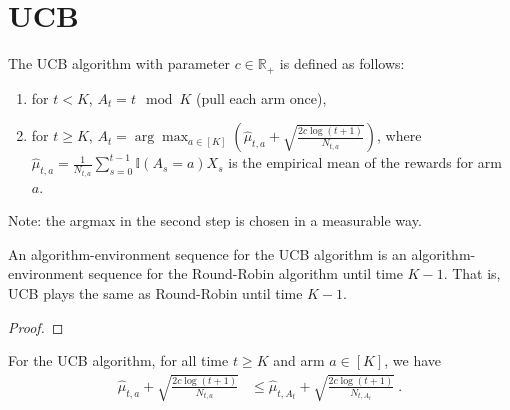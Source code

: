 \section{UCB}

\begin{definition}\label{def:ucbAlgorithm}
  \leanok
The UCB algorithm with parameter $c \in \mathbb{R}_+$ is defined as follows:
\begin{enumerate}
  \item for $t < K$, $A_t = t \mod K$ (pull each arm once),
  \item for $t \ge K$, $A_t = \arg\max_{a \in [K]} \left( \hat{\mu}_{t,a} + \sqrt{\frac{2 c \log(t + 1)}{N_{t,a}}} \right)$, where $\hat{\mu}_{t,a} = \frac{1}{N_{t,a}} \sum_{s=0}^{t-1} \mathbb{I}(A_s = a) X_s$ is the empirical mean of the rewards for arm $a$.
\end{enumerate}
\end{definition}

Note: the argmax in the second step is chosen in a measurable way.


\begin{lemma}\label{lem:UCB.isAlgEnvSeqUntil_roundRobinAlgorithm}
  \leanok
An algorithm-environment sequence for the UCB algorithm is an algorithm-environment sequence for the Round-Robin algorithm until time $K - 1$.
That is, UCB plays the same as Round-Robin until time $K - 1$.
\end{lemma}

\begin{proof}
  \leanok

\end{proof}


\begin{lemma}\label{lem:ucbIndex_le_ucbIndex_arm}
  \leanok
For the UCB algorithm, for all time $t \ge K$ and arm $a \in [K]$, we have
\begin{align*}
  \hat{\mu}_{t,a} + \sqrt{\frac{2 c \log(t + 1)}{N_{t,a}}}
  &\le \hat{\mu}_{t,A_t} + \sqrt{\frac{2 c \log(t + 1)}{N_{t,A_t}}}
  \: .
\end{align*}
\end{lemma}

